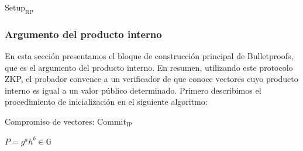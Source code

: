 \begin{minipage}{0.9\textwidth}
    \begin{algorithm}[H]
        \caption{$\operatorname{Setup_{RP}}$}
    \end{algorithm}
\end{minipage}

\subsubsection{Argumento del producto interno}

En esta sección presentamos el bloque de construcción principal de Bulletproofs, que es el argumento del producto interno. En resumen, utilizando este protocolo ZKP, el probador convence a un verificador de que conoce vectores cuyo producto interno es igual a un valor público determinado. Primero describimos el procedimiento de inicialización en el siguiente algoritmo:

\begin{minipage}{0.9\textwidth}
    \begin{algorithm}[H]
        \caption{Compromiso de vectores: $\operatorname{Commit_{IP}}$}
        $P = g^{a}h^{b} \in \mathbb{G}$ \\
    \end{algorithm}
\end{minipage}

